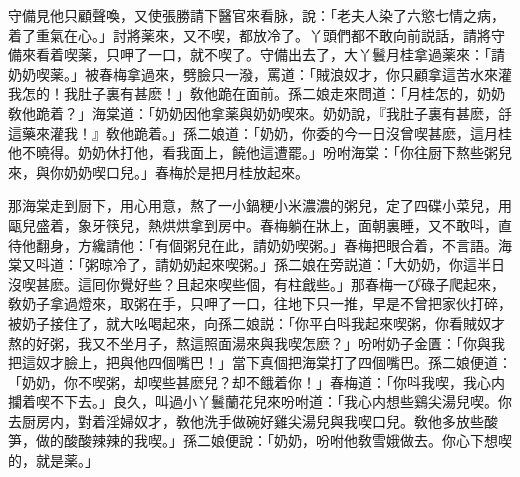 守備見他只顧聲喚，又使張勝請下醫官來看脉，說：「老夫人染了六慾七情之病，着了重氣在心。」討將薬來，又不喫，都放冷了。丫頭們都不敢向前説話，請將守備來看着喫薬，只呷了一口，就不喫了。守備出去了，大丫鬟月桂拿過薬來：「請奶奶喫薬。」被春梅拿過來，劈臉只一潑，罵道：「賊浪奴才，你只顧拿這苦水來灌我怎的！我肚子裏有甚麽！」敎他跪在面前。孫二娘走來問道：「月桂怎的，奶奶敎他跪着？」海棠道：「奶奶因他拿薬與奶奶喫來。奶奶說，『我肚子裏有甚麽，㧱這藥來灌我！』敎他跪着。」孫二娘道：「奶奶，你委的今一日沒曾喫甚麽，這月桂他不曉得。奶奶休打他，看我面上，饒他這遭罷。」吩咐海棠：「你往厨下熬些粥兒來，與你奶奶喫口兒。」春梅於是把月桂放起來。

那海棠走到厨下，用心用意，熬了一小鍋粳小米濃濃的粥兒，定了四碟小菜兒，用甌兒盛着，象牙筷兒，熱烘烘拿到房中。春梅躺在牀上，面朝裏睡，又不敢呌，直待他翻身，方纔請他：「有個粥兒在此，請奶奶喫粥。」春梅把眼合着，不言語。海棠又呌道：「粥晾冷了，請奶奶起來喫粥。」孫二娘在旁説道：「大奶奶，你這半日沒喫甚麽。這囘你覺好些？且起來喫些個，有柱戧些。」那春梅一ぴ碌子爬起來，敎奶子拿過燈來，取粥在手，只呷了一口，往地下只一推，早是不曾把家伙打碎，被奶子接住了，就大吆喝起來，向孫二娘説：「你平白呌我起來喫粥，你看賊奴才熬的好粥，我又不坐月子，熬這照面湯來與我喫怎麽？」吩咐奶子金匱：「你與我把這奴才臉上，把與他四個嘴巴！」當下真個把海棠打了四個嘴巴。孫二娘便道：「奶奶，你不喫粥，却喫些甚麽兒？却不餓着你！」春梅道：「你呌我喫，我心内攔着喫不下去。」良久，叫過小丫鬟蘭花兒來吩咐道：「我心内想些鷄尖湯兒喫。你去厨房内，對着淫婦奴才，敎他洗手做碗好雞尖湯兒與我喫口兒。敎他多放些酸笋，做的酸酸辣辣的我喫。」孫二娘便說：「奶奶，吩咐他敎雪娥做去。你心下想喫的，就是薬。」

